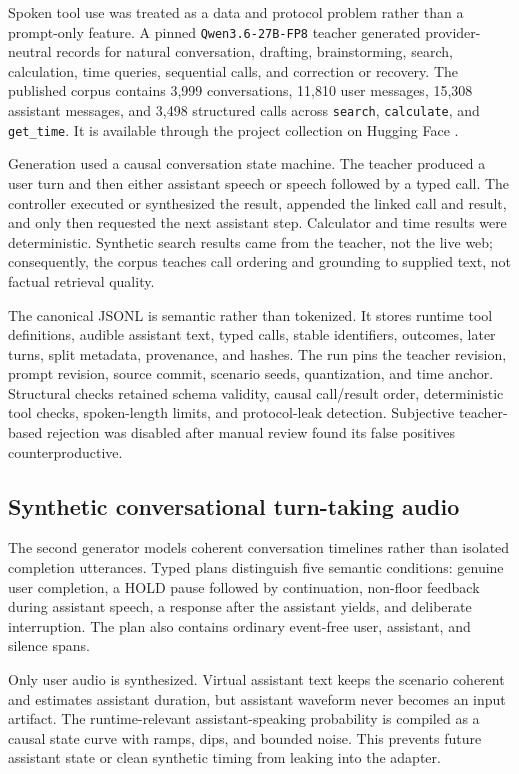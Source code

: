 \documentclass[10pt,twocolumn]{article}
\newcommand{\code}[1]{\texttt{#1}}
\begin{document}
Spoken tool use was treated as a data and protocol problem rather than a prompt-only feature. A
pinned \code{Qwen3.6-27B-FP8} teacher generated provider-neutral records for natural
conversation, drafting, brainstorming, search, calculation, time queries, sequential calls, and
correction or recovery. The published corpus contains 3,999 conversations, 11,810 user messages, 15,308 assistant
messages, and 3,498 structured calls across \code{search}, \code{calculate}, and \code{get\_time}.
It is available through the project collection on Hugging Face \cite{tooldata}.

Generation used a causal conversation state machine. The teacher produced a user turn and then
either assistant speech or speech followed by a typed call. The controller executed or synthesized
the result, appended the linked call and result, and only then requested the next assistant step.
Calculator and time results were deterministic. Synthetic search results came from the teacher,
not the live web; consequently, the corpus teaches call ordering and grounding to supplied text,
not factual retrieval quality.

The canonical JSONL is semantic rather than tokenized. It stores runtime tool definitions, audible
assistant text, typed calls, stable identifiers, outcomes, later turns, split metadata, provenance,
and hashes. The run pins the teacher revision, prompt revision, source commit, scenario seeds,
quantization, and time anchor. Structural checks retained schema validity, causal call/result order,
deterministic tool checks, spoken-length limits, and protocol-leak detection. Subjective
teacher-based rejection was disabled after manual review found its false positives
counterproductive.

\subsection{Synthetic conversational turn-taking audio}

The second generator models coherent conversation timelines rather than isolated completion
utterances. Typed plans distinguish five semantic conditions: genuine user completion, a HOLD
pause followed by continuation, non-floor feedback during assistant speech, a response after the
assistant yields, and deliberate interruption. The plan also contains ordinary event-free user,
assistant, and silence spans.

Only user audio is synthesized. Virtual assistant text keeps the scenario coherent and estimates
assistant duration, but assistant waveform never becomes an input artifact. The runtime-relevant
assistant-speaking probability is compiled as a causal state curve with ramps, dips, and bounded
noise. This prevents future assistant state or clean synthetic timing from leaking into the
adapter.
\end{document}

